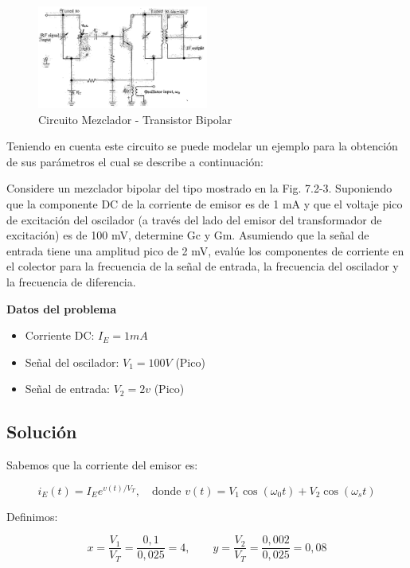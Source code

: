 \documentclass[conference]{IEEEtran}
\begin{document}
	\begin{figure}[h]
		\centering
		\includegraphics[width=0.5\textwidth]{media/circuito-mezclador}
		\caption{Circuito Mezclador - Transistor Bipolar}
		\label{fig:circuito-mezclador}
	\end{figure}
	
	Teniendo en cuenta este circuito se puede modelar un ejemplo para la obtención de sus parámetros el cual se describe a continuación:
	
	Considere un mezclador bipolar del tipo mostrado en la Fig. 7.2-3. Suponiendo que la componente DC de la corriente de emisor es de 1 mA y que el voltaje pico de excitación del oscilador (a través del lado del emisor del transformador de excitación) es de 100 mV, determine Gc y Gm. Asumiendo que la señal de entrada tiene una amplitud pico de 2 mV, evalúe los componentes de corriente en el colector para la frecuencia de la señal de entrada, la frecuencia del oscilador y la frecuencia de diferencia.
	
	\textbf{Datos del problema}
	
	\begin{itemize}
		\item Corriente DC: $I_E = 1mA$
		\item Señal del oscilador: $V_1 = 100V$ (Pico)
		\item Señal de entrada: $V_2 = 2v$ (Pico)
	\end{itemize}
	
	\subsection{Solución}
	
	Sabemos que la corriente del emisor es:
	
	\begin{equation}
		i_{E}(t) = I_{E}e^{v(t)/V_{T}}, \quad \text{donde } v(t) = V_{1}\cos(\omega_{0}t) + V_{2}\cos(\omega_{s}t)
	\end{equation}
	
	Definimos:
	
	\begin{equation}
		x = \frac{V_{1}}{V_{T}} = \frac{0,1}{0,025} = 4, \qquad y = \frac{V_{2}}{V_{T}} = \frac{0,002}{0,025} = 0,08
	\end{equation}
	
\end{document}
